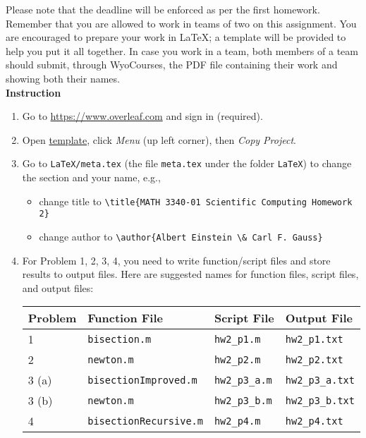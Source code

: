 %
%
%
Please note that the deadline will be enforced as per the first homework. Remember that you are allowed to work in teams of two on this assignment. You are encouraged to prepare your work in \LaTeX{}; a template will be provided to help you put it all together. In case you work in a team, both members of a team should submit, through WyoCourses, the PDF file containing their work and showing both their names. \\[20pt]
\textbf{Instruction}
\begin{enumerate}[label={\arabic*.}]
  \item Go to \url{https://www.overleaf.com} and sign in (required).
  \item Open \href{https://www.overleaf.com/read/fpmxtrsdnsrg}{template}, click \emph{Menu} (up left corner), then \emph{Copy Project}.
  \item Go to \verb|LaTeX/meta.tex| (the file \verb|meta.tex| under the folder \verb|LaTeX|) to change the section and your name, e.g.,
    \begin{itemize}
      \item change title to \verb|\title{MATH 3340-01 Scientific Computing Homework 2}|
      \item change author to \verb|\author{Albert Einstein \& Carl F. Gauss}|
    \end{itemize}
  \item For Problem 1, 2, 3, 4, you need to write function/script files and store results to output files. Here are suggested names for function files, script files, and output files:
    \begin{table}[!hbtp]
      \centering
      \begin{tabular}{llll}
        \toprule
        Problem & Function File               & Script File       & Output File         \\
        \midrule
        1       & \verb|bisection.m|          & \verb|hw2_p1.m|   & \verb|hw2_p1.txt|   \\
        2       & \verb|newton.m|             & \verb|hw2_p2.m|   & \verb|hw2_p2.txt|   \\
        3 (a)   & \verb|bisectionImproved.m|  & \verb|hw2_p3_a.m| & \verb|hw2_p3_a.txt| \\
        3 (b)   & \verb|newton.m|             & \verb|hw2_p3_b.m| & \verb|hw2_p3_b.txt| \\
        4       & \verb|bisectionRecursive.m| & \verb|hw2_p4.m|   & \verb|hw2_p4.txt|   \\
        \bottomrule
      \end{tabular}
    \end{table}


\end{enumerate}
